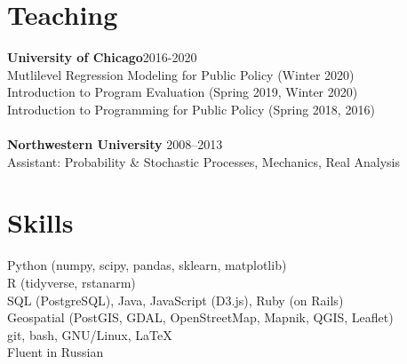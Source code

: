 \documentclass[margin,line]{resume}
\begin{document}
\begin{resume}
        \section{\mysidestyle Teaching}
        {\bf University of Chicago}\hfill{2016-2020}\\
        Mutlilevel Regression Modeling for Public Policy (Winter 2020)\\
        Introduction to Program Evaluation (Spring 2019, Winter 2020)\\Introduction to Programming for Public Policy (Spring 2018, 2016)\\\\
	{\bf Northwestern University} \hfill {2008--2013}\\
	Assistant: Probability \& Stochastic Processes, Mechanics, Real Analysis%
	




    \section{\mysidestyle Skills}
		Python (numpy, scipy, pandas, sklearn, matplotlib) \\
                R (tidyverse, rstanarm) \\
                SQL (PostgreSQL), Java, JavaScript (D3.js), Ruby (on Rails)\\
                Geospatial (PostGIS, GDAL, OpenStreetMap, Mapnik, QGIS, Leaflet)\\
                git, bash, GNU/Linux, \LaTeX\\
                Fluent in Russian

\end{resume}
\end{document}
